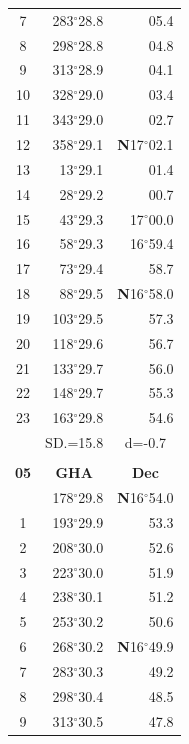 \documentclass[10pt, a4paper]{report}
\begin{document}
\begin{scriptsize}
\begin{tabular*}{0.2\textwidth}[t]{@{\extracolsep{\fill}}|c|rr|}
7 & 283$^\circ$28.8 & 05.4\\
8 & 298$^\circ$28.8 & 04.8\\
9 & 313$^\circ$28.9 & \raisebox{0.24ex}{\boldmath$\cdot$~\boldmath$\cdot$~~}04.1\\
10 & 328$^\circ$29.0 & 03.4\\
11 & 343$^\circ$29.0 & 02.7\\[2Pt]
12 & 358$^\circ$29.1 & \textbf{N}17$^\circ$02.1\\
13 & 13$^\circ$29.1 & 01.4\\
14 & 28$^\circ$29.2 & 00.7\\
15 & 43$^\circ$29.3 & 17$^\circ$00.0\\
16 & 58$^\circ$29.3 & 16$^\circ$59.4\\
17 & 73$^\circ$29.4 & 58.7\\[2Pt]
18 & 88$^\circ$29.5 & \textbf{N}16$^\circ$58.0\\
19 & 103$^\circ$29.5 & 57.3\\
20 & 118$^\circ$29.6 & 56.7\\
21 & 133$^\circ$29.7 & \raisebox{0.24ex}{\boldmath$\cdot$~\boldmath$\cdot$~~}56.0\\
22 & 148$^\circ$29.7 & 55.3\\
23 & 163$^\circ$29.8 & 54.6\\
\hline
\rule{0pt}{2.4ex} & \multicolumn{1}{c}{SD.=15.8} & \multicolumn{1}{c|}{d=-0.7}\\
\hline
\multicolumn{1}{c}{}\\[-0.5ex]\hline
\multicolumn{1}{|c|}{\rule{0pt}{2.6ex}\textbf{05}} & \multicolumn{1}{c}{\textbf{GHA}} & \multicolumn{1}{c|}{\textbf{Dec}}\\
\hline\rule{0pt}{2.6ex}\noindent
0 & 178$^\circ$29.8 & \textbf{N}16$^\circ$54.0\\
1 & 193$^\circ$29.9 & 53.3\\
2 & 208$^\circ$30.0 & 52.6\\
3 & 223$^\circ$30.0 & \raisebox{0.24ex}{\boldmath$\cdot$~\boldmath$\cdot$~~}51.9\\
4 & 238$^\circ$30.1 & 51.2\\
5 & 253$^\circ$30.2 & 50.6\\[2Pt]
6 & 268$^\circ$30.2 & \textbf{N}16$^\circ$49.9\\
7 & 283$^\circ$30.3 & 49.2\\
8 & 298$^\circ$30.4 & 48.5\\
9 & 313$^\circ$30.5 & \raisebox{0.24ex}{\boldmath$\cdot$~\boldmath$\cdot$~~}47.8\\

\end{tabular*}
\end{scriptsize}
\end{document}

